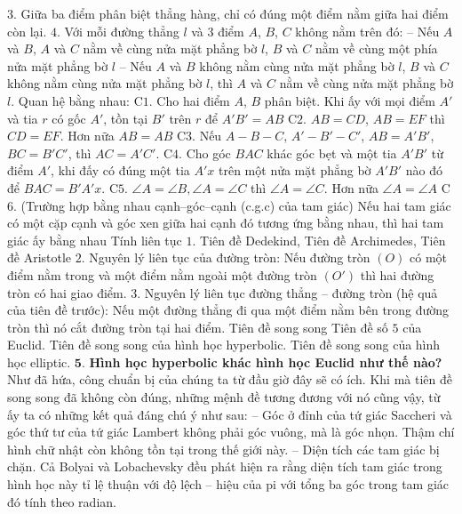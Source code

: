 \begin{multicols}{2}
	\vskip 0.1cm
	$3.$ Giữa ba điểm phân biệt thẳng hàng, chỉ có đúng một điểm nằm giữa hai điểm còn lại.
	\vskip 0.1cm
	$4.$ Với mỗi đường thẳng $l$ và $3$ điểm $A$, $B$, $C$ không nằm trên đó:
	\vskip 0.1cm
	-- Nếu $A$ và $B$, $A$ và $C$ nằm về cùng nửa mặt phẳng bờ $l$, $B$ và $C$ nằm về cùng một phía nửa mặt phẳng bờ $l$
	\vskip 0.1cm
	-- Nếu $A$ và $B$ không nằm cùng nửa mặt phẳng bờ $l$, $B$ và $C$ không nằm cùng nửa mặt phẳng bờ $l$, thì $A$ và $C$ nằm về cùng nửa mặt phẳng bờ $l$.
	\vskip 0.1cm
	Quan hệ bằng nhau: 
	\vskip 0.1cm
	C$1$. Cho hai điểm $A$, $B$ phân biệt. Khi ấy với mọi điểm $A'$ và tia $r$ có gốc $A'$, tồn tại $B'$ trên $r$ để $A'B' = AB$ 
	\vskip 0.1cm
	C$2$. $AB = CD$, $AB = EF$ thì $CD = EF$. Hơn nữa $AB = AB$
	\vskip 0.1cm
	C$3$. Nếu $A - B - C$, $A' - B' - C'$, $AB = A'B'$, $BC = B'C'$, thì $AC = A'C'$.
	\vskip 0.1cm
	C$4$. Cho góc $BAC$ khác góc bẹt và một tia $A'B'$ từ điểm $A'$, khi đấy có đúng một tia $A'x$ trên một nửa mặt phẳng bờ $A'B'$ nào đó để $BAC = B'A'x$.
	\vskip 0.1cm
	C$5$. $ \angle A = \angle B, \angle A = \angle C$ thì $ \angle A = \angle C$. Hơn nữa $ \angle A = \angle A$ 
	\vskip 0.1cm
	C$6$. (Trường hợp bằng nhau cạnh--góc--cạnh (c.g.c) của tam giác) Nếu hai tam giác có một cặp cạnh và góc xen giữa hai cạnh đó tương ứng bằng nhau, thì hai tam giác ấy bằng nhau
	\vskip 0.1cm
	Tính liên tục
	\vskip 0.1cm
	$1.$ Tiên đề Dedekind, Tiên đề Archimedes, Tiên đề Aristotle
	\vskip 0.1cm
	$2.$ Nguyên lý liên tục của đường tròn: Nếu đường tròn $(O)$ có một điểm nằm trong và một điểm nằm ngoài một đường tròn $(O')$ thì hai đường tròn có hai giao điểm.
	\vskip 0.1cm
	$3.$ Nguyên lý liên tục đường thẳng -- đường tròn (hệ quả của tiên đề trước): Nếu một đường thẳng đi qua một điểm nằm bên trong đường tròn thì nó cắt đường tròn tại hai điểm.
	\vskip 0.1cm
	Tiên đề song song
	\vskip 0.1cm
	Tiên đề số $5$ của Euclid.
	\vskip 0.1cm
	Tiên đề song song của hình học hyperbolic. 
	\vskip 0.1cm
	Tiên đề song song của hình học elliptic.
	\vskip 0.1cm
	$\pmb{5.}$ \textbf{\color{lichsutoanhoc}Hình học hyperbolic khác hình học Euclid như thế nào?}
	\vskip 0.1cm
	Như đã hứa, công chuẩn bị của chúng ta từ đầu giờ đây sẽ có ích. Khi mà tiên đề song song đã không còn đúng, những mệnh đề tương đương với nó cũng vậy, từ ấy ta có những kết quả đáng chú ý như sau:
	\vskip 0.1cm
	-- Góc ở đỉnh của tứ giác Saccheri và góc thứ tư của tứ giác Lambert không phải góc vuông, mà là góc nhọn. Thậm chí hình chữ nhật còn không tồn tại trong thế giới này. 
	\vskip 0.1cm
	-- Diện tích các tam giác bị chặn. Cả Bolyai và Lobachevsky đều phát hiện ra rằng diện tích tam giác trong hình học này tỉ lệ thuận với độ lệch -- hiệu của pi với tổng ba góc trong tam giác đó tính theo radian.

\end{multicols}
